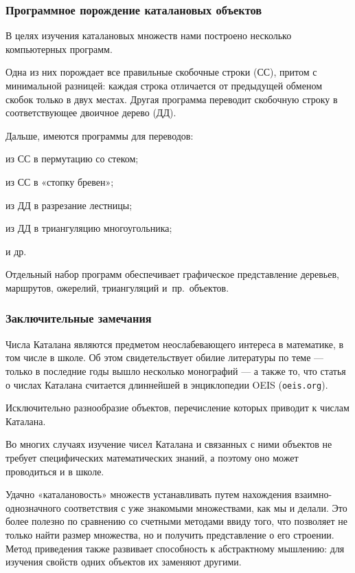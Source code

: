 \documentclass[mathserif]{beamer}
\newenvironment{items}[1][\labelitemi]{\begin{list}{#1}{\setlength{\topsep}{0pt}\setlength{\partopsep}{0pt}\setlength{\parsep}{0pt}\setlength{\itemsep}{\parskip}}}{\end{list}}
\begin{document}
\begin{frame}[fragile]%
\frametitle{Программное порождение каталановых объектов}
В целях изучения каталановых множеств нами построено несколько компьютерных программ.

\medskip

Одна из них порождает все правильные скобочные строки (СС), притом с минимальной разницей: каждая строка отличается от предыдущей обменом скобок только в двух местах.
Другая программа переводит скобочную строку в соответствующее двоичное дерево (ДД).

\medskip

Дальше, имеются программы для переводов:

\smallskip

\begin{items}[—]
\item из СС в пермутацию со стеком;
\item из СС в «стопку бревен»;
\item из ДД в разрезание лестницы;
\item из ДД в триангуляцию многоугольника;
\item и др.
\end{items}

\medskip

Отдельный набор программ обеспечивает графическое представление деревьев, маршрутов, ожерелий, триангуляций и~пр.\ объектов.
\end{frame}

\begin{frame}[fragile]%
\frametitle{Заключительные замечания}
\small
Числа Каталана являются предметом неослабевающего интереса в математике, в том числе в школе.
Об этом свидетельствует обилие литературы по теме — только в последние годы вышло несколько монографий — а также то, что статья о числах Каталана считается длиннейшей в энциклопедии OEIS (\verb:oeis.org:).

\bigskip

Исключительно разнообразие объектов, перечисление которых приводит к числам Каталана.

\bigskip

Во многих случаях изучение чисел Каталана и связанных с ними объектов не требует специфических математических знаний, а поэтому оно может проводиться и в школе.

\bigskip

Удачно «каталановость» множеств устанавливать путем нахождения взаимно-однозначного соответствия с уже знакомыми множествами, как мы и делали.
Это более полезно по сравнению со счетными методами ввиду того, что позволяет не только найти размер множества, но и получить представление о его строении.
Метод приведения также развивает способность к абстрактному мышлению: для изучения свойств одних объектов их заменяют другими.
\end{frame}
\end{document}
